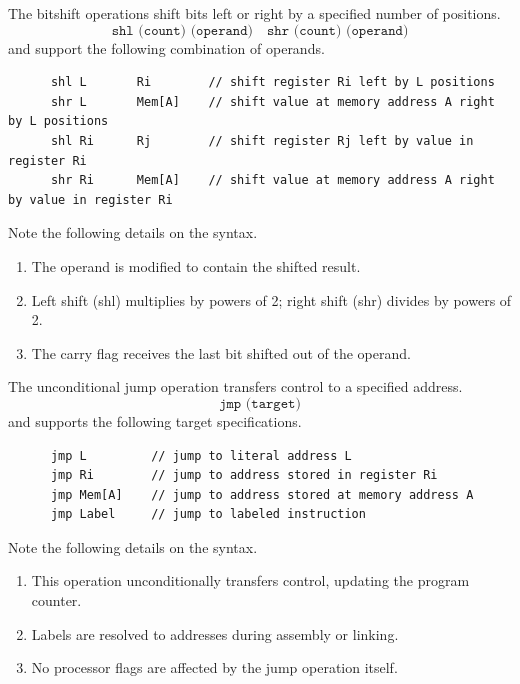   \begin{definition}[Bitshift]
    The bitshift operations shift bits left or right by a specified number of positions.
    \begin{equation}
      \texttt{shl (count) (operand)} \quad \texttt{shr (count) (operand)}
    \end{equation}
    and support the following combination of operands.
    \begin{lstlisting}
      shl L       Ri        // shift register Ri left by L positions
      shr L       Mem[A]    // shift value at memory address A right by L positions
      shl Ri      Rj        // shift register Rj left by value in register Ri
      shr Ri      Mem[A]    // shift value at memory address A right by value in register Ri
    \end{lstlisting}
    Note the following details on the syntax.
    \begin{enumerate}
      \item The operand is modified to contain the shifted result.
      \item Left shift (shl) multiplies by powers of 2; right shift (shr) divides by powers of 2.
      \item The carry flag receives the last bit shifted out of the operand.
    \end{enumerate}
  \end{definition}

  \begin{definition}
    The unconditional jump operation transfers control to a specified address.
    \begin{equation}
      \texttt{jmp (target)}
    \end{equation}
    and supports the following target specifications.
    \begin{lstlisting}
      jmp L         // jump to literal address L
      jmp Ri        // jump to address stored in register Ri
      jmp Mem[A]    // jump to address stored at memory address A
      jmp Label     // jump to labeled instruction
    \end{lstlisting}
    Note the following details on the syntax.
    \begin{enumerate}
      \item This operation unconditionally transfers control, updating the program counter.
      \item Labels are resolved to addresses during assembly or linking.
      \item No processor flags are affected by the jump operation itself.
    \end{enumerate}
  \end{definition}

